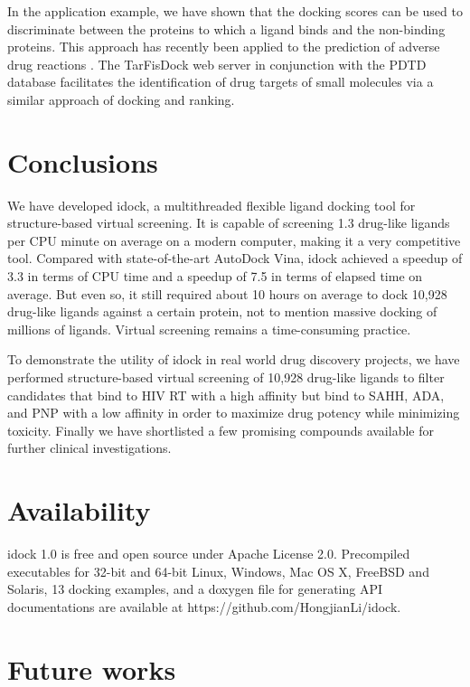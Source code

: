 In the application example, we have shown that the docking scores can be used to discriminate between the proteins to which a ligand binds and the non-binding proteins. This approach has recently been applied to the prediction of adverse drug reactions \citep{1563}. The TarFisDock web server \citep{1580} in conjunction with the PDTD database \citep{1581} facilitates the identification of drug targets of small molecules via a similar approach of docking and ranking.

\section{Conclusions}

We have developed idock, a multithreaded flexible ligand docking tool for structure-based virtual screening. It is capable of screening 1.3 drug-like ligands per CPU minute on average on a modern computer, making it a very competitive tool. Compared with state-of-the-art AutoDock Vina, idock achieved a speedup of 3.3 in terms of CPU time and a speedup of 7.5 in terms of elapsed time on average. But even so, it still required about 10 hours on average to dock 10,928 drug-like ligands against a certain protein, not to mention massive docking of millions of ligands. Virtual screening remains a time-consuming practice.

To demonstrate the utility of idock in real world drug discovery projects, we have performed structure-based virtual screening of 10,928 drug-like ligands to filter candidates that bind to HIV RT with a high affinity but bind to SAHH, ADA, and PNP with a low affinity in order to maximize drug potency while minimizing toxicity. Finally we have shortlisted a few promising compounds available for further clinical investigations.

\section{Availability}

idock 1.0 is free and open source under Apache License 2.0. Precompiled executables for 32-bit and 64-bit Linux, Windows, Mac OS X, FreeBSD and Solaris, 13 docking examples, and a doxygen file for generating API documentations are available at https://github.com/HongjianLi/idock.

\section{Future works}

